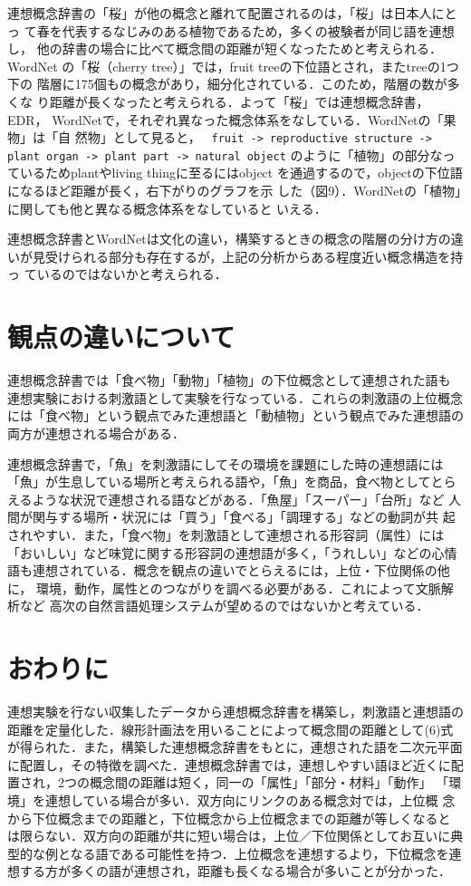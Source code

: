 連想概念辞書の「桜」が他の概念と離れて配置されるのは，「桜」は日本人にとっ
て春を代表するなじみのある植物であるため，多くの被験者が同じ語を連想し，
他の辞書の場合に比べて概念間の距離が短くなったためと考えられる．WordNet
の「桜（cherry tree）」では，fruit treeの下位語とされ，またtreeの1つ下の
階層に175個もの概念があり，細分化されている．このため，階層の数が多くな
り距離が長くなったと考えられる．よって「桜」では連想概念辞書，EDR，
WordNetで，それぞれ異なった概念体系をなしている．WordNetの「果物」は「自
然物」として見ると，{\small
\verb+ fruit -> reproductive structure -> plant organ -> plant part -> natural object+}
のように「植物」の部分なっているためplantやliving thingに至るにはobject
を通過するので，objectの下位語になるほど距離が長く，右下がりのグラフを示
した（図9）．WordNetの「植物」に関しても他と異なる概念体系をなしていると
いえる．

連想概念辞書とWordNetは文化の違い，構築するときの概念の階層の分け方の違
いが見受けられる部分も存在するが，上記の分析からある程度近い概念構造を持っ
ているのではないかと考えられる．

\section{観点の違いについて}

連想概念辞書では「食べ物」「動物」「植物」の下位概念として連想された語も
連想実験における刺激語として実験を行なっている．これらの刺激語の上位概念
には「食べ物」という観点でみた連想語と「動植物」という観点でみた連想語の
両方が連想される場合がある．

連想概念辞書で，「魚」を刺激語にしてその環境を課題にした時の連想語には
「魚」が生息している場所と考えられる語や，「魚」を商品，食べ物としてとら
えるような状況で連想される語などがある．「魚屋」「スーパー」「台所」など
人間が関与する場所・状況には「買う」「食べる」「調理する」などの動詞が共
起されやすい．また，「食べ物」を刺激語として連想される形容詞（属性）には
「おいしい」など味覚に関する形容詞の連想語が多く，「うれしい」などの心情
語も連想されている．概念を観点の違いでとらえるには，上位・下位関係の他に，
環境，動作，属性とのつながりを調べる必要がある．これによって文脈解析など
高次の自然言語処理システムが望めるのではないかと考えている．

\section{おわりに}

連想実験を行ない収集したデータから連想概念辞書を構築し，刺激語と連想語の
距離を定量化した．線形計画法を用いることによって概念間の距離として(6)式
が得られた．また，構築した連想概念辞書をもとに，連想された語を二次元平面
に配置し，その特徴を調べた．連想概念辞書では，連想しやすい語ほど近くに配
置され，2つの概念間の距離は短く，同一の「属性」「部分・材料」「動作」
「環境」を連想している場合が多い．双方向にリンクのある概念対では，上位概
念から下位概念までの距離と，下位概念から上位概念までの距離が等しくなると
は限らない．双方向の距離が共に短い場合は，上位／下位関係としてお互いに典
型的な例となる語である可能性を持つ．上位概念を連想するより，下位概念を連
想する方が多くの語が連想され，距離も長くなる場合が多いことが分かった．

